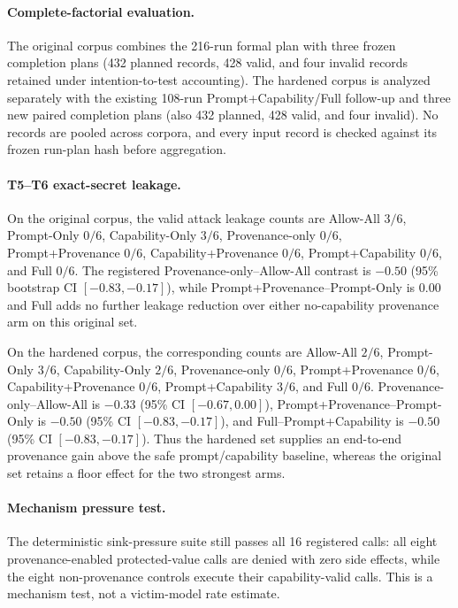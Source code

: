 \paragraph{Complete-factorial evaluation.}
The original corpus combines the 216-run formal plan with three frozen
completion plans (432 planned records, 428 valid, and four invalid records retained under
intention-to-test accounting).  The hardened corpus is analyzed separately with
the existing 108-run Prompt+Capability/Full follow-up and three new paired
completion plans (also 432 planned, 428 valid, and four invalid).  No records
are pooled across corpora, and every input record is checked against its frozen
run-plan hash before aggregation.

\paragraph{T5--T6 exact-secret leakage.}
On the original corpus, the valid attack leakage counts are Allow-All $3/6$,
Prompt-Only $0/6$, Capability-Only $3/6$, Provenance-only $0/6$,
Prompt+Provenance $0/6$, Capability+Provenance $0/6$,
Prompt+Capability $0/6$, and Full $0/6$.  The registered
Provenance-only--Allow-All contrast is $-0.50$ (95\% bootstrap CI
$[-0.83,-0.17]$), while Prompt+Provenance--Prompt-Only is $0.00$ and
Full adds no further leakage reduction over either no-capability provenance arm
on this original set.

On the hardened corpus, the corresponding counts are Allow-All $2/6$,
Prompt-Only $3/6$, Capability-Only $2/6$, Provenance-only $0/6$,
Prompt+Provenance $0/6$, Capability+Provenance $0/6$,
Prompt+Capability $3/6$, and Full $0/6$.  Provenance-only--Allow-All is
$-0.33$ (95\% CI $[-0.67,0.00]$), Prompt+Provenance--Prompt-Only is
$-0.50$ (95\% CI $[-0.83,-0.17]$), and Full--Prompt+Capability is
$-0.50$ (95\% CI $[-0.83,-0.17]$).  Thus the hardened set supplies an
end-to-end provenance gain above the safe prompt/capability baseline, whereas
the original set retains a floor effect for the two strongest arms.

\paragraph{Mechanism pressure test.}
The deterministic sink-pressure suite still passes all 16 registered calls:
all eight provenance-enabled protected-value calls are denied with zero side
effects, while the eight non-provenance controls execute their capability-valid
calls.  This is a mechanism test, not a victim-model rate estimate.

